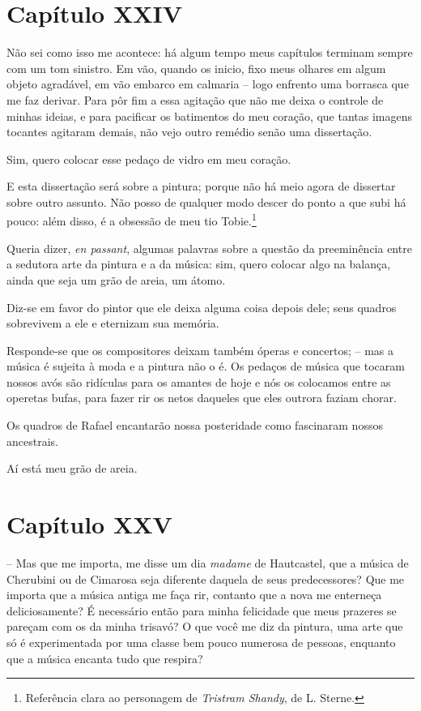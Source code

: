 \section*{Capítulo XXIV}

 Não sei como isso me acontece: há algum tempo meus capítulos terminam
sempre com um tom sinistro. Em vão, quando os inicio, fixo meus olhares
em algum objeto agradável, em vão embarco em calmaria -- logo
enfrento uma borrasca que me faz derivar. Para pôr fim a essa agitação
que não me deixa o controle de minhas ideias, e para pacificar os
batimentos do meu coração, que tantas imagens tocantes agitaram demais,
não vejo outro remédio senão uma dissertação.

Sim, quero colocar esse pedaço de vidro em meu coração.

E esta dissertação será sobre a pintura; porque não há meio agora de
dissertar sobre outro assunto. Não posso de qualquer modo descer do
ponto a que subi há pouco: além disso, é a obsessão de meu tio
Tobie.\footnote{ Referência clara ao personagem de \textit{Tristram
Shandy}, de L. Sterne.} 

Queria dizer, \textit{en passant}, algumas palavras sobre a questão da
preeminência entre a sedutora arte da pintura e a da música: sim, quero
colocar algo na balança, ainda que seja um grão de areia, um átomo.

Diz-se em favor do pintor que ele deixa alguma coisa depois dele; seus
quadros sobrevivem a ele e eternizam sua memória. 

Responde-se que os compositores deixam também óperas e concertos; --
mas a música é sujeita à moda e a pintura não o é. Os pedaços de música
que tocaram nossos avós são ridículas para os amantes de hoje e nós os
colocamos entre as operetas bufas, para fazer rir os netos daqueles que
eles outrora faziam chorar.

Os quadros de Rafael encantarão nossa posteridade como fascinaram nossos
ancestrais.

Aí está meu grão de areia.

\section*{Capítulo XXV}

 -- Mas que me importa, me disse um dia \textit{madame} de Hautcastel,
que a música de Cherubini ou de Cimarosa seja diferente daquela de seus
predecessores? Que me importa que a música antiga me faça rir, contanto
que a nova me enterneça deliciosamente? É necessário então para minha
felicidade que meus prazeres se pareçam com os da minha trisavó? O que
você me diz da pintura, uma arte que só é experimentada por uma classe
bem pouco numerosa de pessoas, enquanto que a música encanta tudo que
respira?

